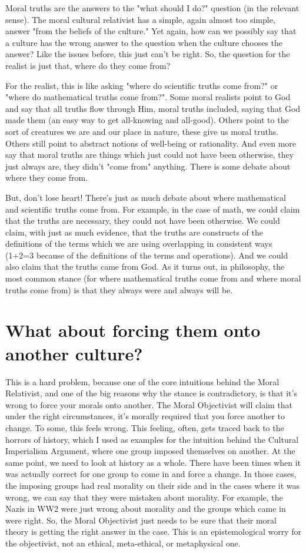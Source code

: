 Moral truths are the answers to the "what should I do?" question (in the relevant sense). The moral cultural relativist has a simple, again almost too simple, answer "from the beliefs of the culture." Yet again, how can we possibly say that a culture has the wrong answer to the question when the culture chooses the answer? Like the issues before, this just can't be right. So, the question for the realist is just that, where do they come from? 

For the realist, this is like asking "where do scientific truths come from?" or "where do mathematical truths come from?". Some moral realists point to God and say that all truths flow through Him, moral truths included, saying that God made them (an easy way to get all-knowing and all-good). Others point to the sort of creatures we are and our place in nature, these give us moral truths. Others still point to abstract notions of well-being or rationality.  And even more say that moral truths are things which just could not have been otherwise, they just always are, they didn't "come from" anything. There is some debate about where they come from.

But, don't lose heart! There's just as much debate about where mathematical and scientific truths come from. For example, in the case of math, we could claim that the truths are necessary, they could not have been otherwise. We could claim, with just as much evidence, that the truths are constructs of the definitions of the terms which we are using overlapping in consistent ways (1+2=3 because of the definitions of the terms and operations). And we could also claim that the truths came from God.  As it turns out, in philosophy, the most common stance (for where mathematical truths come from and where moral truths come from) is that they always were and always will be.

\section{What about forcing them onto another culture?}

This is a hard problem, because one of the core intuitions behind the Moral Relativist, and one of the big reasons why the stance is contradictory, is that it’s wrong to force your morals onto another. The Moral Objectivist will claim that under the right circumstances, it’s morally required that you force another to change. To some, this feels wrong. This feeling, often, gets traced back to the horrors of history, which I used as examples for the intuition behind the Cultural Imperialism Argument, where one group imposed themselves on another. At the same point, we need to look at history as a whole. There have been times when it was actually correct for one group to come in and force a change. In those cases, the imposing groups had real morality on their side and in the cases where it was wrong, we can say that they were mistaken about morality. For example, the Nazis in WW2 were just wrong about morality and the groups which came in were right. So, the Moral Objectivist just needs to be sure that their moral theory is getting the right answer in the case. This is an epistemological worry for the objectivist, not an ethical, meta-ethical, or metaphysical one. 

